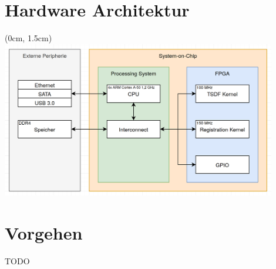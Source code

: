 \documentclass{beamer}
\begin{document}
\section{Hardware Architektur}
\begin{frame}{\secname}
\begin{textblock*}{12.8cm}(0cm, 1.5cm)
\centering
\includegraphics[width=12cm]{images/HW_Architecture.png}
\end{textblock*}
\end{frame}

\section{Vorgehen}
\begin{frame}{\secname}
TODO    
\end{frame}
\end{document}
